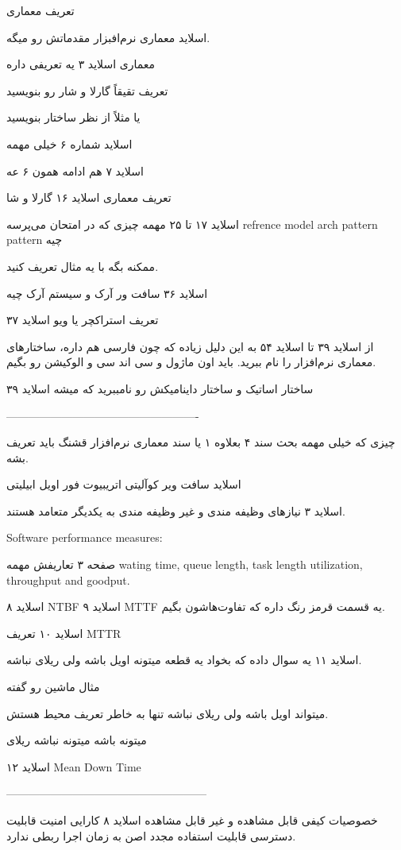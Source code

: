 تعریف معماری

اسلاید معماری نرم‌افبزار مقدماتش رو میگه.

معماری اسلاید ۳ یه تعریفی داره

تعریف تقیقاً گارلا و شار رو بنویسید

یا مثلاً از نظر ساختار بنویسید

اسلاید شماره ۶ خیلی مهمه

اسلاید ۷ هم ادامه همون ۶ عه

تعریف معماری اسلاید ۱۶ گارلا و شا

اسلاید ۱۷ تا ۲۵ مهمه چیزی که در امتحان می‌پرسه
refrence model 
arch pattern
pattern چیه

ممکنه بگه با یه مثال تعریف کنید.

اسلاید ۳۶ سافت ور آرک و سیستم آرک چیه

تعریف استراکچر یا ویو اسلاید ۳۷

از اسلاید ۳۹ تا اسلاید ۵۴ به این دلیل زیاده که چون فارسی هم داره، ساختار‌های
معماری نرم‌افزار را نام ببرید. باید اون ماژول و سی اند سی و الوکیشن رو بگیم.

ساختار اساتیک و ساختار داینامیکش رو نامببرید که میشه اسلاید ۳۹

----------------------------------------------------

چیزی که خیلی مهمه بحث سند ۴ بعلاوه ۱ یا سند معماری نرم‌افزار قشنگ باید تعریف بشه.

اسلاید سافت ویر کوآلیتی اتریبیوت فور اویل ابیلیتی

اسلاید ۳ نیاز‌های وظیفه مندی و غیر وظیفه مندی به یکدیگر متعامد هستند.

Software performance measures:

صفحه ۳ تعاریفش مهمه wating time, queue length, task length utilization,
throughput and goodput.

اسلاید ۸ NTBF اسلاید ۹ MTTF یه قسمت قرمز رنگ داره که تفاوت‌هاشون بگیم.

اسلاید ۱۰ تعریف MTTR

اسلاید ۱۱ یه سوال داده که بخواد یه قطعه میتونه اویل باشه ولی ریلای نباشه.

مثال ماشین رو گفته

میتواند اویل باشه ولی ریلای نباشه تنها به خاطر تعریف محیط هستش.

میتونه باشه میتونه نباشه ریلای

اسلاید ۱۲ Mean Down Time

------------------------------------------------------

خصوصیات کیفی قابل مشاهده و غیر قابل مشاهده اسلاید ۸
کارایی امنیت قابلیت دسترسی
قابلیت استفاده مجدد اصن به زمان اجرا ربطی ندارد.

